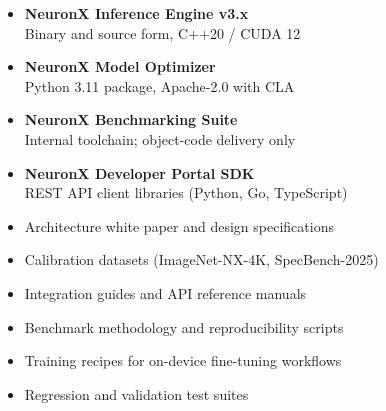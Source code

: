 \documentclass[11pt,a4paper]{article}
\begin{document}
\noindent
\begin{minipage}[t]{0.475\textwidth}
\begin{tcolorbox}[
  enhanced,
  colback=NexaLight,
  colframe=NexaSlate,
  boxrule=0.8pt,
  arc=3pt,
  title={\faLock\enspace Licensed Software},
  fonttitle=\bfseries\color{NexaNavy},
  coltitle=NexaNavy,
  attach boxed title to top left={yshift=-2mm, xshift=8mm},
  boxed title style={colback=NexaSlate!15, colframe=NexaSlate, arc=2pt},
  left=8pt, right=8pt, top=12pt, bottom=8pt
]
\small
\begin{itemize}[leftmargin=1.2em, itemsep=3pt]
  \item \textbf{NeuronX Inference Engine v3.x}\\
        Binary and source form, C++20 / CUDA 12
  \item \textbf{NeuronX Model Optimizer}\\
        Python 3.11 package, Apache-2.0 with CLA
  \item \textbf{NeuronX Benchmarking Suite}\\
        Internal toolchain; object-code delivery only
  \item \textbf{NeuronX Developer Portal SDK}\\
        REST API client libraries (Python, Go, TypeScript)
\end{itemize}
\end{tcolorbox}
\end{minipage}%
\hfill
\begin{minipage}[t]{0.475\textwidth}
\begin{tcolorbox}[
  enhanced,
  colback=NexaLight,
  colframe=NexaSlate,
  boxrule=0.8pt,
  arc=3pt,
  title={\faBook\enspace Know-How and Documentation},
  fonttitle=\bfseries\color{NexaNavy},
  coltitle=NexaNavy,
  attach boxed title to top left={yshift=-2mm, xshift=8mm},
  boxed title style={colback=NexaSlate!15, colframe=NexaSlate, arc=2pt},
  left=8pt, right=8pt, top=12pt, bottom=8pt
]
\small
\begin{itemize}[leftmargin=1.2em, itemsep=3pt]
  \item Architecture white paper and design specifications
  \item Calibration datasets (ImageNet-NX-4K, SpecBench-2025)
  \item Integration guides and API reference manuals
  \item Benchmark methodology and reproducibility scripts
  \item Training recipes for on-device fine-tuning workflows
  \item Regression and validation test suites
\end{itemize}
\end{tcolorbox}
\end{minipage}
\end{document}
